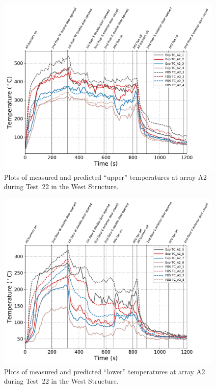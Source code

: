 \begin{figure}[!h]
	\centering
	\includegraphics[width=\columnwidth]{Figures/Plots/Validation/Temperature/Test_22_TC_A2_upper}
	\caption{Plots of measured and predicted ``upper'' temperatures at array A2 during Test~22 in the West Structure.}
	\label{fig:TCA2_upper_data_Test22}
\end{figure}
\begin{figure}[!h]
	\centering
	\includegraphics[width=\columnwidth]{Figures/Plots/Validation/Temperature/Test_22_TC_A2_lower}
	\caption{Plots of measured and predicted ``lower'' temperatures at array A2 during Test~22 in the West Structure.}
	\label{fig:TCA2_lower_data_Test22}
\end{figure}

